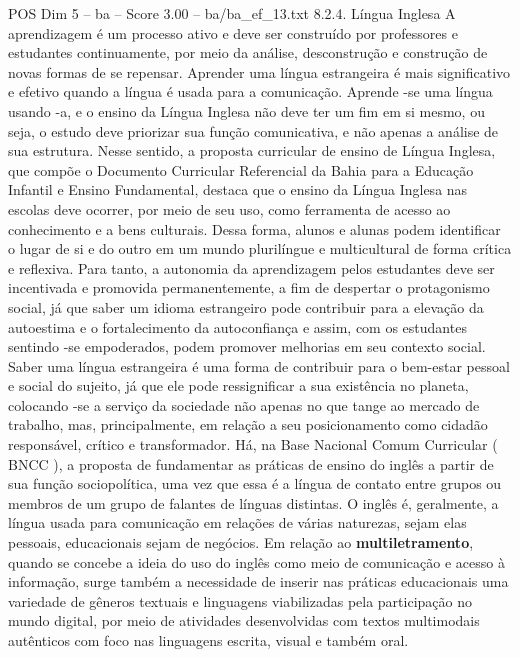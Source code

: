 \begin{textsample}{POS Dim 5 – ba – Score 3.00 – ba/ba\_ef\_13.txt}  \label{ex:f5_pos_279}
8.2.4.
Língua Inglesa A aprendizagem é um processo ativo e deve ser construído por professores e estudantes continuamente, por meio da análise, desconstrução e construção de novas formas de se repensar.
Aprender uma língua estrangeira é mais significativo e efetivo quando a língua é usada para a comunicação.
Aprende -se uma língua usando -a, e o ensino da Língua Inglesa não deve ter um fim em si mesmo, ou seja, o estudo deve priorizar sua função comunicativa, e não apenas a análise de sua estrutura.
Nesse sentido, a proposta curricular de ensino de Língua Inglesa, que compõe o Documento Curricular Referencial da Bahia para a Educação Infantil e Ensino Fundamental, destaca que o ensino da Língua Inglesa nas escolas deve ocorrer, por meio de seu uso, como ferramenta de acesso ao conhecimento e a bens culturais.
Dessa forma, alunos e alunas podem identificar o lugar de si e do outro em um mundo plurilíngue e multicultural de forma crítica e reflexiva.
Para tanto, a autonomia da aprendizagem pelos estudantes deve ser incentivada e promovida permanentemente, a fim de despertar o protagonismo social, já que saber um idioma estrangeiro pode contribuir para a elevação da autoestima e o fortalecimento da autoconfiança e assim, com os estudantes sentindo -se empoderados, podem promover melhorias em seu contexto social.
Saber uma língua estrangeira é uma forma de contribuir para o bem-estar pessoal e social do sujeito, já que ele pode ressignificar a sua existência no planeta, colocando -se a serviço da sociedade não apenas no que tange ao mercado de trabalho, mas, principalmente, em relação a seu posicionamento como cidadão responsável, crítico e transformador.
Há, na Base Nacional Comum Curricular ( BNCC ), a proposta de fundamentar as práticas de ensino do inglês a partir de sua função sociopolítica, uma vez que essa é a língua de contato entre grupos ou membros de um grupo de falantes de línguas distintas.
O inglês é, geralmente, a língua usada para comunicação em relações de várias naturezas, sejam elas pessoais, educacionais sejam de negócios.
Em relação ao \textbf{multiletramento}, quando se concebe a ideia do uso do inglês como meio de comunicação e acesso à informação, surge também a necessidade de inserir nas práticas educacionais uma variedade de gêneros textuais e linguagens viabilizadas pela participação no mundo digital, por meio de atividades desenvolvidas com textos multimodais autênticos com foco nas linguagens escrita, visual e também oral.

\end{textsample}
